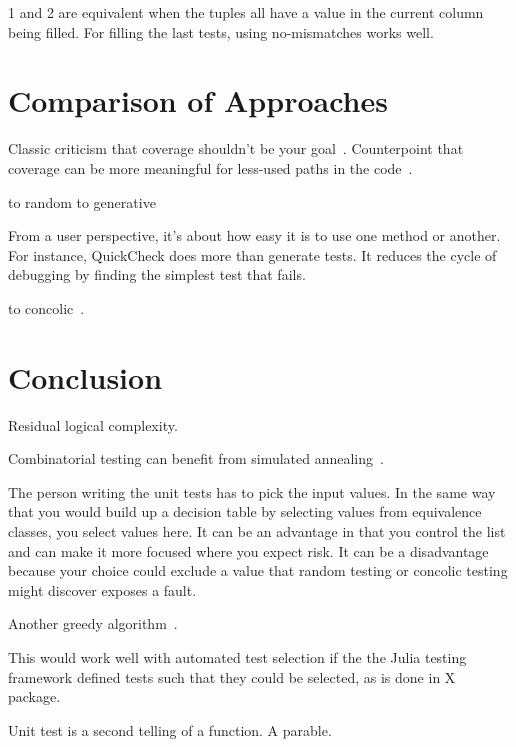 \documentclass{juliacon}
\begin{document}
\vskip 6pt
1 and 2 are equivalent when the tuples all have a value in the current column being filled.
For filling the last tests, using no-mismatches works well.

\section{Comparison of Approaches}
Classic criticism that coverage shouldn't be your goal~\cite{Inozemtseva2014-gz}. Counterpoint that coverage can be more meaningful for less-used paths in the code~\cite{Cai2005-ex}.

\vskip 6pt
to random
to generative

\vskip 6pt
From a user perspective, it's about how easy it is to use one method or another. For instance, QuickCheck does more than generate tests. It reduces the cycle of debugging by finding the simplest test that fails.

\vskip 6pt
to concolic~\cite{King1976-jt,Wang2018-xh}.


\section{Conclusion}
Residual logical complexity.

Combinatorial testing can benefit from simulated annealing~\cite{Petke2015-ex}.


\vskip 6pt
The person writing the unit tests has to pick the input values. In the same way that you would build up a decision table by selecting values from equivalence classes, you select values here. It can be an advantage in that you control the list and can make it more focused where you expect risk. It can be a disadvantage because your choice could exclude a value that random testing or concolic testing might discover exposes a fault.

Another greedy algorithm~\cite{Calvagna2012-ic,Koc2018-vs}.

This would work well with automated test selection if the the Julia testing framework defined tests such that they could be selected, as is done in X package.


\vskip 6pt
Unit test is a second telling of a function. A parable.


\end{document}
